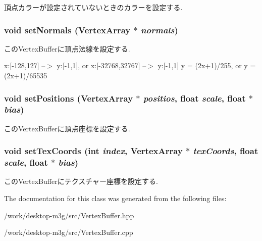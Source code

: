 頂点カラーが設定されていないときのカラーを設定する. \hypertarget{classm3g_1_1VertexBuffer_4aabe6277538d5aa8285759dab85002a}{
\subsubsection[{setNormals}]{\setlength{\rightskip}{0pt plus 5cm}void setNormals ({\bf VertexArray} $\ast$ {\em normals})}}
\label{classm3g_1_1VertexBuffer_4aabe6277538d5aa8285759dab85002a}


このVertexBufferに頂点法線を設定する.

x:\mbox{[}-128,127\mbox{]} --$>$ y:\mbox{[}-1,1\mbox{]}, or x:\mbox{[}-32768,32767\mbox{]} --$>$ y:\mbox{[}-1,1\mbox{]} y = (2x+1)/255, or y = (2x+1)/65535 \hypertarget{classm3g_1_1VertexBuffer_527460407f488d5128bae7d0adb6da43}{
\subsubsection[{setPositions}]{\setlength{\rightskip}{0pt plus 5cm}void setPositions ({\bf VertexArray} $\ast$ {\em positios}, \/  float {\em scale}, \/  float $\ast$ {\em bias})}}
\label{classm3g_1_1VertexBuffer_527460407f488d5128bae7d0adb6da43}


このVertexBufferに頂点座標を設定する. \hypertarget{classm3g_1_1VertexBuffer_626af19bd7702480ac9e8ea4532d27d5}{
\subsubsection[{setTexCoords}]{\setlength{\rightskip}{0pt plus 5cm}void setTexCoords (int {\em index}, \/  {\bf VertexArray} $\ast$ {\em texCoords}, \/  float {\em scale}, \/  float $\ast$ {\em bias})}}
\label{classm3g_1_1VertexBuffer_626af19bd7702480ac9e8ea4532d27d5}


このVertexBufferにテクスチャー座標を設定する. 

The documentation for this class was generated from the following files:\begin{CompactItemize}
\item 
/work/desktop-m3g/src/VertexBuffer.hpp\item 
/work/desktop-m3g/src/VertexBuffer.cpp\end{CompactItemize}
